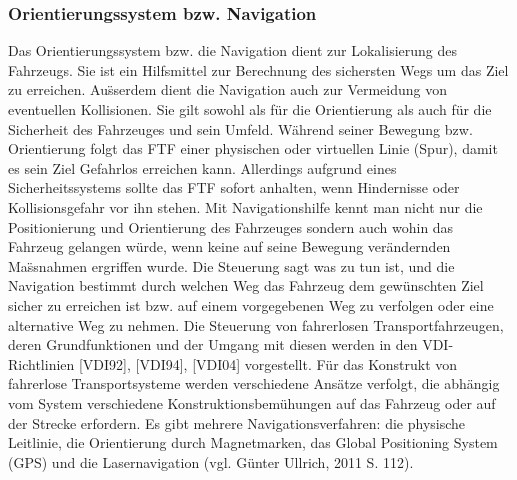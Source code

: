 \subsubsection{Orientierungssystem bzw. Navigation}
Das Orientierungssystem bzw. die Navigation dient zur Lokalisierung des Fahrzeugs. Sie ist ein Hilfsmittel zur Berechnung des sichersten Wegs um das Ziel zu erreichen. Au\"sserdem dient die Navigation auch zur Vermeidung von eventuellen Kollisionen. Sie gilt sowohl als f\"ur die Orientierung als auch f\"ur die Sicherheit des Fahrzeuges und sein Umfeld. W\"ahrend seiner Bewegung bzw. Orientierung folgt das FTF einer physischen oder virtuellen Linie (Spur), damit es sein Ziel Gefahrlos erreichen kann. Allerdings aufgrund eines Sicherheitssystems sollte das FTF sofort anhalten, wenn Hindernisse oder Kollisionsgefahr vor ihn stehen. 
Mit Navigationshilfe kennt man nicht nur die Positionierung und Orientierung des Fahrzeuges sondern auch wohin das Fahrzeug gelangen w\"urde, wenn keine auf seine Bewegung ver\"andernden Ma\"ssnahmen ergriffen wurde. Die Steuerung sagt was zu tun ist, und die Navigation bestimmt durch welchen Weg das Fahrzeug dem gew\"unschten Ziel sicher zu erreichen ist bzw. auf einem vorgegebenen Weg zu verfolgen oder eine alternative Weg zu nehmen. Die Steuerung von fahrerlosen Transportfahrzeugen, deren Grundfunktionen und der Umgang mit diesen werden in den VDI- Richtlinien [VDI92], [VDI94], [VDI04] vorgestellt. F\"ur das Konstrukt von fahrerlose Transportsysteme werden verschiedene Ans\"atze verfolgt, die  abh\"angig vom System verschiedene Konstruktionsbem\"uhungen auf das Fahrzeug oder auf der Strecke erfordern. Es gibt mehrere Navigationsverfahren: die physische Leitlinie, die Orientierung durch Magnetmarken, das Global Positioning System (GPS) und die Lasernavigation (vgl. G\"unter Ullrich, 2011 S. 112).
